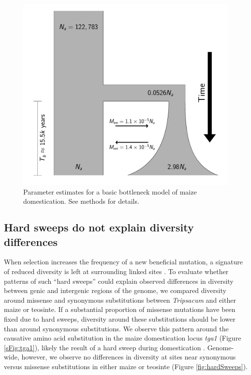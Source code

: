 \documentclass[12pt,a4paper]{article}
\newcommand{\mbh}[1]{\textcolor{blue}{\scriptsize #1}}
\begin{document}
\begin{figure}[!tb]
\centering
\includegraphics[width=.5\textwidth]{FigsAndFiles/DomesticationModel/domesticationModel.pdf}
\caption{Parameter estimates for a basic bottleneck model of maize domestication. See methods for details. \label{fig:bottleneck} }
\end{figure}


\subsection*{Hard sweeps do not explain diversity differences} %
When selection increases the frequency of a new beneficial mutation, a signature of reduced diversity is left at surrounding linked sites \cite{smith1974}.
To evaluate whether patterns of such ``hard sweeps'' could explain observed differences in diversity between genic and intergenic regions of the genome, we compared diversity around missense and synonymous substitutions between \emph{Tripsacum} and either maize or teosinte.
If a substantial proportion of missense mutations have been fixed due to hard sweeps, diversity around these substitutions should be lower than around synonymous substitutions. 
We observe this pattern around the causative amino acid substitution in the maize domestication locus \emph{tga1} (Figure \ref{sFig:tga1}), likely the result of a hard sweep during domestication \cite{wang2015}. Genome-wide, however, we observe no differences in diversity at sites near synonymous versus missense substitutions in either maize or teosinte (Figure \ref{fig:hardSweeps}).

\end{document}
